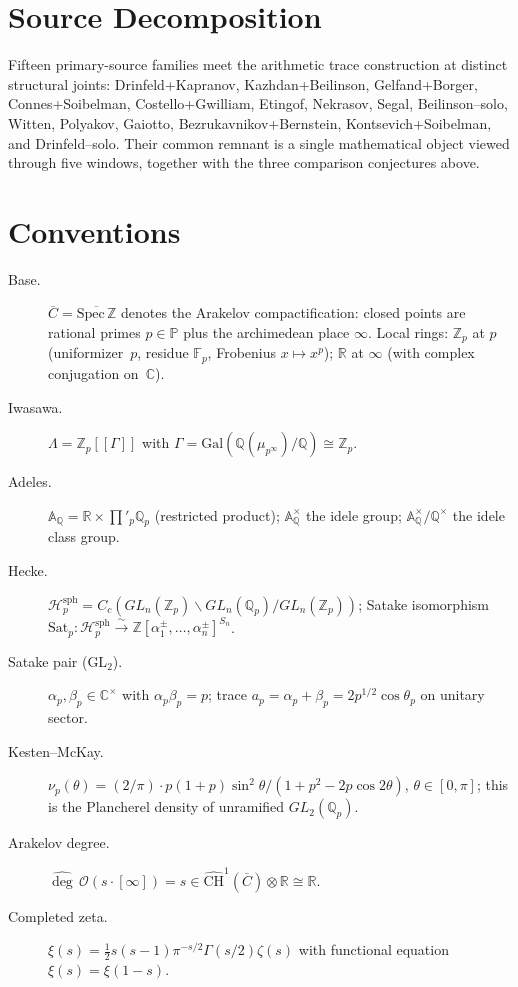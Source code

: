 \section{Source Decomposition}
\label{v4-arith:manifesto:provenance}

Fifteen primary-source families meet the arithmetic trace construction
at distinct structural joints:
Drinfeld+Kapranov, Kazhdan+Beilinson, Gelfand+Borger,
Connes+Soibelman, Costello+Gwilliam, Etingof, Nekrasov, Segal,
Beilinson--solo, Witten, Polyakov, Gaiotto,
Bezrukavnikov+Bernstein, Kontsevich+Soibelman, and Drinfeld--solo.
Their common remnant is a single mathematical object viewed through
five windows, together with the three comparison conjectures above.

\section{Conventions}
\label{v4-arith:manifesto:conventions}

\begin{description}
\item[Base.] \(\overline{C}=\overline{\mathrm{Spec}\,\mathbb{Z}}\)
denotes the Arakelov compactification: closed points are rational
primes \(p\in\mathbb{P}\) plus the archimedean place \(\infty\). Local
rings: \(\mathbb{Z}_{p}\) at \(p\) (uniformizer~\(p\), residue
\(\mathbb{F}_{p}\), Frobenius \(x\mapsto x^{p}\)); \(\mathbb{R}\) at
\(\infty\) (with complex conjugation on~\(\mathbb{C}\)).
\item[Iwasawa.] \(\Lambda=\mathbb{Z}_{p}[[\Gamma]]\) with
\(\Gamma=\mathrm{Gal}(\mathbb{Q}(\mu_{p^{\infty}})/\mathbb{Q})\cong\mathbb{Z}_{p}\).
\item[Adeles.] \(\mathbb{A}_{\mathbb{Q}}=\mathbb{R}\times\prod'_{p}\mathbb{Q}_{p}\)
(restricted product); \(\mathbb{A}_{\mathbb{Q}}^{\times}\) the idele
group; \(\mathbb{A}_{\mathbb{Q}}^{\times}/\mathbb{Q}^{\times}\) the
idele class group.
\item[Hecke.] \(\mathcal{H}_{p}^{\mathrm{sph}}=C_{c}(GL_{n}(\mathbb{Z}_{p})\backslash GL_{n}(\mathbb{Q}_{p})/GL_{n}(\mathbb{Z}_{p}))\);
Satake isomorphism
\(\mathrm{Sat}_{p}:\mathcal{H}_{p}^{\mathrm{sph}}\xrightarrow{\sim}
\mathbb{Z}[\alpha_{1}^{\pm},\dots,\alpha_{n}^{\pm}]^{S_{n}}\).
\item[Satake pair (GL\({}_{2}\)).] \(\alpha_{p},\beta_{p}\in\mathbb{C}^{\times}\)
with \(\alpha_{p}\beta_{p}=p\); trace
\(a_{p}=\alpha_{p}+\beta_{p}=2p^{1/2}\cos\theta_{p}\) on unitary
sector.
\item[Kesten--McKay.] \(\nu_{p}(\theta)=(2/\pi)\cdot p(1+p)\sin^{2}\theta/(1+p^{2}-2p\cos 2\theta)\),
\(\theta\in[0,\pi]\); this is the Plancherel density of unramified
\(GL_{2}(\mathbb{Q}_{p})\).
\item[Arakelov degree.] \(\widehat{\deg}\,\mathcal{O}(s\cdot[\infty])=s\in\widehat{\mathrm{CH}}^{1}(\overline{C})\otimes\mathbb{R}\cong\mathbb{R}\).
\item[Completed zeta.] \(\xi(s)=\tfrac{1}{2}s(s-1)\pi^{-s/2}\Gamma(s/2)\zeta(s)\)
with functional equation \(\xi(s)=\xi(1-s)\).
\end{description}

